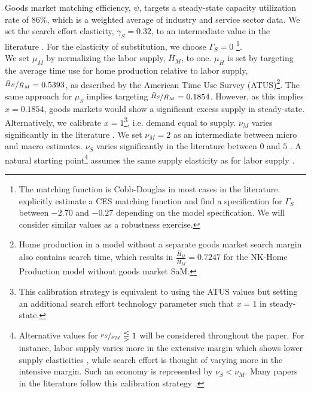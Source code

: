 \documentclass[12pt,3p,authoryear,review]{elsarticle}
\begin{document}
Goods market matching efficiency, $\psi$, targets a steady-state capacity utilization rate of $86\%$, which is a weighted average of industry and service sector data. We set the search effort elasticity, $\gamma_S = 0.32$, to an intermediate value in the literature \citep{bai2025demand,michaillatAggregateDemandIdle2015,qiuProcyclicalProductivityNew2022}. For the elasticity of substitution, we choose $\Gamma_S=0$ \citep{bai2025demand,michaillatAggregateDemandIdle2015,den2024role}\footnote{The matching function is Cobb-Douglas in most cases in the literature. \cite{qiuProcyclicalProductivityNew2022} explicitly estimate a CES matching function and find a specification for $\Gamma_S$ between $-2.70$ and $-0.27$ depending on the model specification. We will consider similar values as a robustness exercise.}.\\%
We set $\mu_M$ by normalizing the labor supply, $\bar{H}_M$, to one. $\mu_H$ is set by targeting the average time use for home production relative to labor supply, $\nicefrac{\bar{H}_H}{\bar{H}_M} = 0.5393$, as described by the American Time Use Survey (ATUS)\footnote{Home production in a model without a separate goods market search margin also contains search time, which results in $\frac{\bar{H}_H}{\bar{H}_M} = 0.7247$ for the NK-Home Production model without goods market SaM.}. The same approach for $\mu_S$ implies targeting $\nicefrac{\bar{H}_S}{\bar{H}_M} = 0.1854$. However, as this implies $x=0.1854$, goods markets would show a significant excess supply in steady-state. Alternatively, we calibrate $x=1$\footnote{This calibration strategy is equivalent to using the ATUS values but setting an additional search effort technology parameter such that $x=1$ in steady-state.}, i.e. demand equal to supply. $\nu_M$ varies significantly in the literature \citep{keaneMicroMacroLabor2012, chetty2013does}. We set $\nu_M = 2$ as an intermediate between micro and macro estimates. $\nu_S$ varies significantly in the literature between $0$ \citep{qiuProcyclicalProductivityNew2022, michaillatAggregateDemandIdle2015} and $5$ \citep{bai2025demand}. A natural starting point\footnote{Alternative values for $\nicefrac{\nu_S}{\nu_M} \lesseqgtr 1$ will be considered throughout the paper. For instance, labor supply varies more in the extensive margin which shows lower supply elasticities \citep{chetty2013does}, while search effort is thought of varying more in the intensive margin. Such an economy is represented by $\nu_S < \nu_M$. Many papers in the literature follow this calibration strategy \citep{michaillatAggregateDemandIdle2015,qiuProcyclicalProductivityNew2022}.} assumes the same supply elasticity as for labor supply \citep{gnocchiHouseworkFiscalExpansions2016,huoDemandInducedFluctuations2020}.\\%
\end{document}
